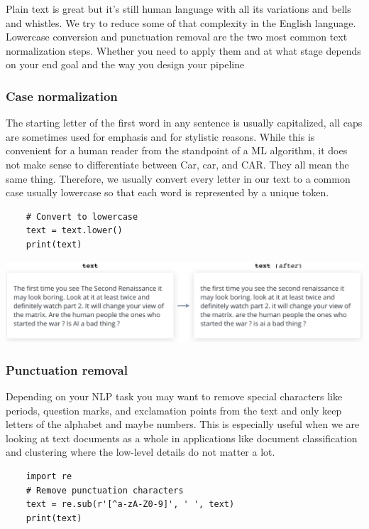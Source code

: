 Plain text is great but it's still human language with all its variations and bells and whistles. We try to reduce some of that complexity in the English language. Lowercase conversion and punctuation removal are the two most common text normalization steps. Whether you need to apply them and at what stage depends on your end goal and the way you
design your pipeline

\subsubsection{Case normalization}

The starting letter of the first word in any sentence is usually capitalized, all caps are sometimes used for emphasis and for stylistic reasons. While this is convenient for a human reader from the standpoint of a ML algorithm, it does not make sense to differentiate between Car, car, and CAR. They all mean the same thing. Therefore, we usually convert every letter in our text to a common case usually lowercase so that each word is represented by a unique token. 
\begin{lstlisting}
    # Convert to lowercase
    text = text.lower()
    print(text)
\end{lstlisting}

\includegraphics[width=1\linewidth]{img//rnn//intro/case_normalization.png}

\subsubsection{Punctuation removal}
Depending on your NLP task you may want to remove special characters like periods, question marks, and exclamation points from the text and only keep letters of the alphabet and maybe numbers. This is especially useful when we are looking at text documents as a whole in applications like document classification and clustering where the low-level details do not matter a lot. 

\begin{lstlisting}
    import re
    # Remove punctuation characters
    text = re.sub(r'[^a-zA-Z0-9]', ' ', text)
    print(text)
\end{lstlisting}

